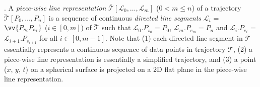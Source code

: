 . A \textit{piece-wise line representation} $\overline{\mathcal{T}}\left[\mathcal{L}_0, \ldots, \mathcal{L}_m\right]$ ($0< m \le n$) of a trajectory $\dddot{\mathcal{T}}\left[P_0, \ldots, P_n\right]$ is a sequence of continuous \textit{directed line segments} $\mathcal{L}_{i}$ = $\vv{P_{s_i}P_{e_i}}$ ($i\in\left[0,m\right]$) of $\dddot{\mathcal{T}}$ such that $\mathcal{L}_{0}.P_{s_0} = P_0$, $\mathcal{L}_{m}.P_{e_m} = P_n$ and  $\mathcal{L}_{i}.P_{e_i}$ = $\mathcal{L}_{i+1}.P_{s_{i+1}}$ for all $i\in\left[0, m-1\right]$.
Note that (1) each directed line segment in $\overline{\mathcal{T}}$ essentially represents a continuous sequence of data points in trajectory $\dddot{\mathcal{T}}$, (2) a piece-wise line representation is essentially a simplified trajectory, {and (3) a point ($x$, $y$, $t$) on a spherical surface is  projected on a 2D flat plane in the piece-wise line representation.}


